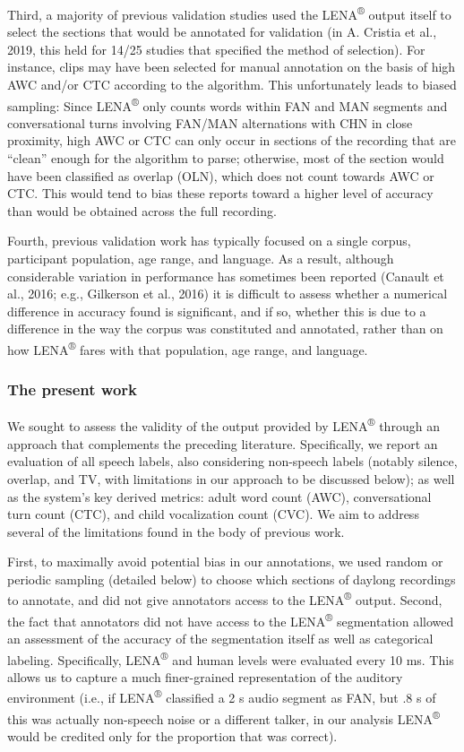 \documentclass[english,table,man,floatsintext]{apa6}
\begin{document}
Third, a majority of previous validation studies used the
LENA\textsuperscript{®} output itself to select the sections that would
be annotated for validation (in A. Cristia et al., 2019, this held for
14/25 studies that specified the method of selection). For instance,
clips may have been selected for manual annotation on the basis of high
AWC and/or CTC according to the algorithm. This unfortunately leads to
biased sampling: Since LENA\textsuperscript{®} only counts words within
FAN and MAN segments and conversational turns involving FAN/MAN
alternations with CHN in close proximity, high AWC or CTC can only occur
in sections of the recording that are \enquote{clean} enough for the
algorithm to parse; otherwise, most of the section would have been
classified as overlap (OLN), which does not count towards AWC or CTC.
This would tend to bias these reports toward a higher level of accuracy
than would be obtained across the full recording.

Fourth, previous validation work has typically focused on a single
corpus, participant population, age range, and language. As a result,
although considerable variation in performance has sometimes been
reported (Canault et al., 2016; e.g., Gilkerson et al., 2016) it is
difficult to assess whether a numerical difference in accuracy found is
significant, and if so, whether this is due to a difference in the way
the corpus was constituted and annotated, rather than on how
LENA\textsuperscript{®} fares with that population, age range, and
language.

\subsubsection{The present work}\label{the-present-work}

We sought to assess the validity of the output provided by
LENA\textsuperscript{®} through an approach that complements the
preceding literature. Specifically, we report an evaluation of all
speech labels, also considering non-speech labels (notably silence,
overlap, and TV, with limitations in our approach to be discussed
below); as well as the system's key derived metrics: adult word count
(AWC), conversational turn count (CTC), and child vocalization count
(CVC). We aim to address several of the limitations found in the body of
previous work.

First, to maximally avoid potential bias in our annotations, we used
random or periodic sampling (detailed below) to choose which sections of
daylong recordings to annotate, and did not give annotators access to
the LENA\textsuperscript{®} output. Second, the fact that annotators did
not have access to the LENA\textsuperscript{®} segmentation allowed an
assessment of the accuracy of the segmentation itself as well as
categorical labeling. Specifically, LENA\textsuperscript{®} and human
levels were evaluated every 10 ms. This allows us to capture a much
finer-grained representation of the auditory environment (i.e., if
LENA\textsuperscript{®} classified a 2 s audio segment as FAN, but .8 s
of this was actually non-speech noise or a different talker, in our
analysis LENA\textsuperscript{®} would be credited only for the
proportion that was correct).
\end{document}
